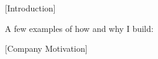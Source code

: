 
[Introduction]

A few examples of how and why I build:
\vspace{12pt}
\begin{itemize}[leftmargin=0.2in, labelsep=6pt, itemsep=5pt, topsep=2pt]
[Examples]
\end{itemize}
\vspace{12pt}
[Company Motivation]

